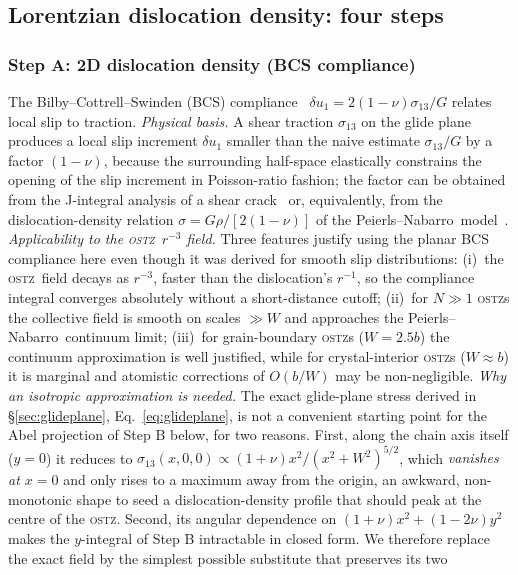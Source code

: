 \documentclass[5p,sort&compress]{elsarticle}
\newcommand{\OSTZ}{\textsc{ostz}}
\newcommand{\PN}{Peierls--Nabarro}
\begin{document}
\subsection{Lorentzian dislocation density: four steps}
\label{sec:lorentzian}

\subsubsection{Step A: 2D dislocation density (BCS compliance)}
\label{sec:stepA-BCS}

The Bilby--Cottrell--Swinden (BCS) compliance~\cite{bilby1963}
$\delta u_1=2(1-\nu)\sigma_{13}/G$ relates local slip to traction.
\textit{Physical basis.} A shear traction $\sigma_{13}$ on the
glide plane produces a local slip increment $\delta u_1$ smaller
than the naive estimate $\sigma_{13}/G$ by a factor $(1-\nu)$,
because the surrounding half-space elastically constrains the
opening of the slip increment in Poisson-ratio fashion; the factor
can be obtained from the J-integral analysis of a shear
crack~\cite{rice1968} or, equivalently, from the dislocation-density
relation $\sigma=G\rho/[2(1-\nu)]$ of the \PN\
model~\cite{hirth1982}.
\textit{Applicability to the \OSTZ\ $r^{-3}$ field.} Three features
justify using the planar BCS compliance here even though it was
derived for smooth slip distributions: (i)~the \OSTZ\ field decays
as $r^{-3}$, faster than the dislocation's $r^{-1}$, so the
compliance integral converges absolutely without a short-distance
cutoff; (ii)~for $N\gg1$ \OSTZ s the collective field is smooth on
scales $\gg W$ and approaches the \PN\ continuum limit; (iii)~for
grain-boundary \OSTZ s ($W=2.5b$) the continuum approximation is
well justified, while for crystal-interior \OSTZ s ($W\approx b$) it
is marginal and atomistic corrections of $O(b/W)$ may be
non-negligible.
\textit{Why an isotropic approximation is needed.} The exact
glide-plane stress derived in \S\ref{sec:glideplane},
Eq.~\eqref{eq:glideplane}, is not a convenient starting point for
the Abel projection of Step B below, for two reasons. First, along
the chain axis itself ($y=0$) it reduces to
$\sigma_{13}(x,0,0)\propto(1+\nu)x^2/(x^2+W^2)^{5/2}$, which
\emph{vanishes at $x=0$} and only rises to a maximum away from the
origin, an awkward, non-monotonic shape to seed a dislocation-density
profile that should peak at the centre of the \OSTZ. Second, its
angular dependence on $(1+\nu)x^2+(1-2\nu)y^2$ makes the $y$-integral
of Step B intractable in closed form. We therefore replace the exact
field by the simplest possible substitute that preserves its two
\end{document}
